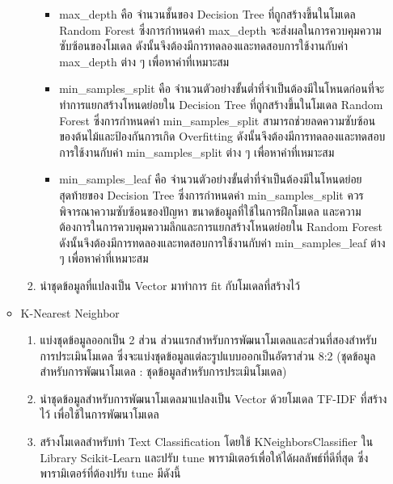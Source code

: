 \documentclass[12pt,oneside,openright,a4paper]{cpe-thai-project}
\begin{document}
\begin{enumerate}
\begin{itemize}
\begin{enumerate}
\begin{itemize}
                            \item max\_depth คือ จำนวนชั้นของ Decision Tree ที่ถูกสร้างขึ้นในโมเดล Random Forest ซึ่งการกำหนดค่า max\_depth จะส่งผลในการควบคุมความซับซ้อนของโมเดล
                                  ดังนั้นจึงต้องมีการทดลองและทดสอบการใช้งานกับค่า max\_depth ต่าง ๆ เพื่อหาค่าที่เหมาะสม
                            \item min\_samples\_split คือ จำนวนตัวอย่างขั้นต่ำที่จำเป็นต้องมีในโหนดก่อนที่จะทำการแยกสร้างโหนดย่อยใน Decision Tree ที่ถูกสร้างขึ้นในโมเดล Random Forest
                                  ซึ่งการกำหนดค่า min\_samples\_split สามารถช่วยลดความซับซ้อนของต้นไม้และป้องกันการเกิด Overfitting
                                  ดังนั้นจึงต้องมีการทดลองและทดสอบการใช้งานกับค่า min\_samples\_split ต่าง ๆ เพื่อหาค่าที่เหมาะสม
                            \item min\_samples\_leaf คือ จำนวนตัวอย่างขั้นต่ำที่จำเป็นต้องมีในโหนดย่อยสุดท้ายของ Decision Tree 
                                  ซึ่งการกำหนดค่า min\_samples\_split ควรพิจารณาความซับซ้อนของปัญหา ขนาดข้อมูลที่ใช้ในการฝึกโมเดล 
                                  และความต้องการในการควบคุมความลึกและการแยกสร้างโหนดย่อยใน Random Forest
                                  ดังนั้นจึงต้องมีการทดลองและทดสอบการใช้งานกับค่า min\_samples\_leaf ต่าง ๆ เพื่อหาค่าที่เหมาะสม
                          \end{itemize}
                    \item นำชุดข้อมูลที่แปลงเป็น Vector มาทำการ fit กับโมเดลที่สร้างไว้
                  \end{enumerate}
            \item K-Nearest Neighbor
                  \begin{enumerate}
                    \item แบ่งชุดข้อมูลออกเป็น 2 ส่วน ส่วนแรกสำหรับการพัฒนาโมเดลและส่วนที่สองสำหรับการประเมินโมเดล 
                    ซึ่งจะแบ่งชุดข้อมูลแต่ละรูปแบบออกเป็นอัตราส่วน 8:2 (ชุดข้อมูลสำหรับการพัฒนาโมเดล : ชุดข้อมูลสำหรับการประเมินโมเดล) 
                    \item นำชุดข้อมูลสำหรับการพัฒนาโมเดลมาแปลงเป็น Vector ด้วยโมเดล TF-IDF ที่สร้างไว้ เพื่อใช้ในการพัฒนาโมเดล
                    \item สร้างโมเดลสำหรับทำ Text Classification โดยใช้ KNeighborsClassifier ใน Library Scikit-Learn 
                          และปรับ tune พารามิเตอร์เพื่อให้ได้ผลลัพธ์ที่ดีที่สุด ซึ่งพารามิเตอร์ที่ต้องปรับ tune มีดังนี้
                          \begin{itemize}

\end{itemize}
\end{enumerate}
\end{itemize}
\end{enumerate}
\end{document}

